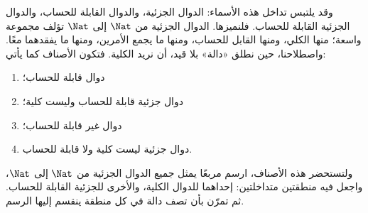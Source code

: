 \documentclass[../../../include/open-logic-section]{subfiles}
\begin{document}
وقد يلتبس تداخل هذه الأسماء: الدوال الجزئية، والدوال القابلة للحساب،
والدوال الجزئية القابلة للحساب. فلنميزها. الدوال
الجزئية من $\Nat$ إلى $\Nat$ تؤلف مجموعة واسعة؛ منها الكلي،
ومنها القابل للحساب، ومنها ما يجمع الأمرين، ومنها ما يفقدهما
معًا. واصطلاحنا، حين نطلق «دالة» بلا قيد، أن نريد الكلية.
فتكون الأصناف كما يأتي:
\begin{enumerate}
\item دوال قابلة للحساب؛
\item دوال جزئية قابلة للحساب وليست كلية؛
\item دوال غير قابلة للحساب؛
\item دوال جزئية ليست كلية ولا قابلة للحساب.
\end{enumerate}
ولتستحضر هذه الأصناف، ارسم مربعًا يمثل جميع الدوال الجزئية من
$\Nat$ إلى $\Nat$، واجعل فيه منطقتين متداخلتين: إحداهما للدوال الكلية،
والأخرى للجزئية القابلة للحساب. ثم تمرّن بأن
تصف دالة في كل منطقة ينقسم إليها الرسم.
\end{document}
